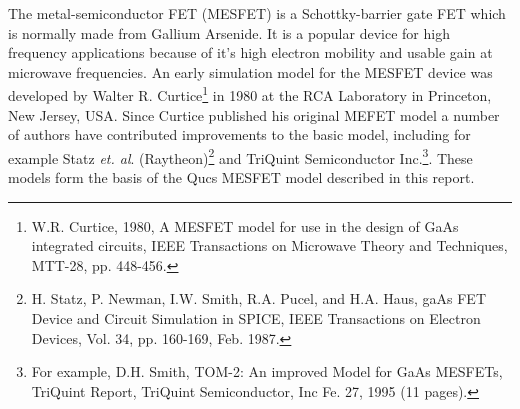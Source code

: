 The metal-semiconductor FET (MESFET) is a Schottky-barrier gate FET
which is normally made from Gallium Arsenide.  It is a popular device
for high frequency applications because of it's high electron mobility
and usable gain at microwave frequencies. An early simulation model
for the MESFET device was developed by Walter
R. Curtice\footnote{W.R. Curtice, 1980, A MESFET model for use in the
design of GaAs integrated circuits, IEEE Transactions on Microwave
Theory and Techniques, MTT-28, pp. 448-456.} in 1980 at the RCA
Laboratory in Princeton, New Jersey, USA. Since Curtice published his
original MEFET model a number of authors have contributed improvements
to the basic model, including for example Statz
\textit{et. al}. (Raytheon)\footnote{H. Statz, P. Newman, I.W. Smith,
R.A. Pucel, and H.A. Haus, gaAs FET Device and Circuit Simulation in
SPICE, IEEE Transactions on Electron Devices, Vol. 34, pp. 160-169,
Feb. 1987.} and TriQuint Semiconductor Inc.\footnote{For example,
D.H. Smith, TOM-2: An improved Model for GaAs MESFETs, TriQuint
Report, TriQuint Semiconductor, Inc Fe. 27, 1995 (11 pages).}. These
models form the basis of the Qucs MESFET model described in this
report.



